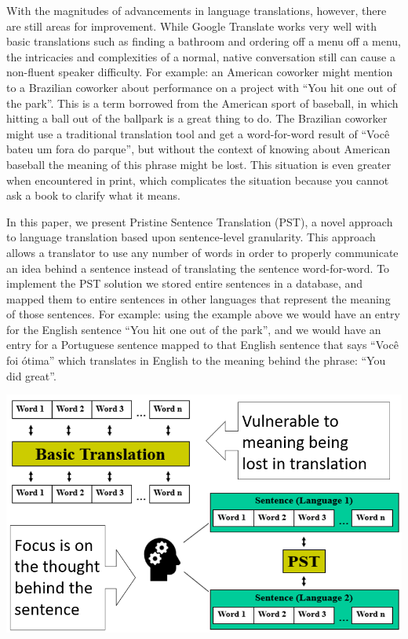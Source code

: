 \documentclass[runningheads]{llncs}
\begin{document}
	With the magnitudes of advancements in language translations, however, there are still areas for improvement. While Google Translate works very well with basic translations such as finding a bathroom and ordering off a menu off a menu, the intricacies and complexities of a normal, native conversation still can cause a non-fluent speaker difficulty. For example: an American coworker might mention to a Brazilian coworker about performance on a project with ``You hit one out of the park''. This is a term borrowed from the American sport of baseball, in which hitting a ball out of the ballpark is a great thing to do. The Brazilian coworker might use a traditional translation tool and get a word-for-word result of ``Você bateu um fora do parque'', but without the context of knowing about American baseball the meaning of this phrase might be lost. This situation is even greater when encountered in print, which complicates the situation because you cannot ask a book to clarify what it means.
	
	In this paper, we present Pristine Sentence Translation (PST), a novel approach to language translation based upon sentence-level granularity. This approach allows a translator to use any number of words in order to properly communicate an idea behind a sentence instead of translating the sentence word-for-word. To implement the PST solution we stored entire sentences in a database, and mapped them to entire sentences in other languages that represent the meaning of those sentences. For example: using the example above we would have an entry for the English sentence ``You hit one out of the park'', and we would have an entry for a Portuguese sentence mapped to that English sentence that says ``Você foi ótima'' which translates in English to the meaning behind the phrase: ``You did great''. 


	\begin{minipage}{\linewidth}
		\begin{center}
			\hspace*{-.5in}
			\includegraphics[width=\textwidth]{Pristine_Sentence_Translation_Visual.png}
			\label{fig:Pristine Sentence Translation High-Level Overview}
			\vspace*{1cm}
		\end{center}
	\end{minipage}
	\afterpage{\clearpage}
\end{document}

